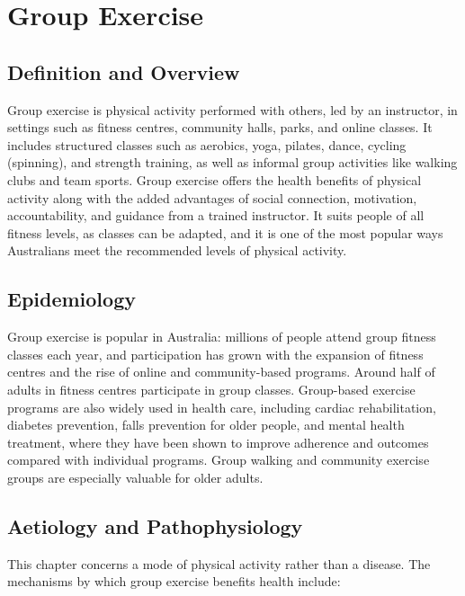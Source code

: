 \chapter{Group Exercise}

\section*{Definition and Overview}
Group exercise is physical activity performed with others, led by an instructor, in settings such as fitness centres, community halls, parks, and online classes. It includes structured classes such as aerobics, yoga, pilates, dance, cycling (spinning), and strength training, as well as informal group activities like walking clubs and team sports. Group exercise offers the health benefits of physical activity along with the added advantages of social connection, motivation, accountability, and guidance from a trained instructor. It suits people of all fitness levels, as classes can be adapted, and it is one of the most popular ways Australians meet the recommended levels of physical activity.

\section*{Epidemiology}
Group exercise is popular in Australia: millions of people attend group fitness classes each year, and participation has grown with the expansion of fitness centres and the rise of online and community-based programs. Around half of adults in fitness centres participate in group classes. Group-based exercise programs are also widely used in health care, including cardiac rehabilitation, diabetes prevention, falls prevention for older people, and mental health treatment, where they have been shown to improve adherence and outcomes compared with individual programs. Group walking and community exercise groups are especially valuable for older adults.

\section*{Aetiology and Pathophysiology}
This chapter concerns a mode of physical activity rather than a disease. The mechanisms by which group exercise benefits health include:

